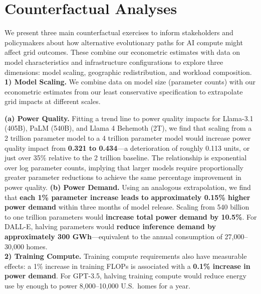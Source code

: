 \documentclass[sigconf,authordraft]{acmart}
\begin{document}

\section{Counterfactual Analyses}
\label{sec:counterfactuals}

We present three main counterfactual exercises to inform stakeholders and policymakers about how alternative evolutionary paths for AI compute might affect grid outcomes. These combine our econometric estimates with data on model characteristics and infrastructure configurations to explore three dimensions: model scaling, geographic redistribution, and workload composition.\\

\noindent\textbf{1) Model Scaling.} We combine data on model size (parameter counts) with our econometric estimates from our least conservative specification to extrapolate grid impacts at different scales.

\noindent\textbf{(a) Power Quality.} Fitting a trend line to power quality impacts for Llama-3.1 (405B), PaLM (540B), and Llama 4 Behemoth (2T), we find that scaling from a 2 trillion parameter model to a 4 trillion parameter model would increase power quality impact from \textbf{0.321 to 0.434}---a deterioration of roughly 0.113 units, or just over 35\% relative to the 2 trillion baseline. The relationship is exponential over log parameter counts, implying that larger models require proportionally greater parameter reductions to achieve the same percentage improvement in power quality. \textbf{(b) Power Demand.} Using an analogous extrapolation, we find that \textbf{each 1\% parameter increase leads to approximately 0.15\% higher power demand} within three months of model release. Scaling from 540 billion to one trillion parameters would \textbf{increase total power demand by 10.5\%}. For DALL-E, halving parameters would \textbf{reduce inference demand by approximately 300 GWh}---equivalent to the annual consumption of 27,000--30,000 homes.\\

\noindent\textbf{2) Training Compute.} Training compute requirements also have measurable effects: a 1\% increase in training FLOPs is associated with a \textbf{0.1\% increase in power demand}. For GPT-3.5, halving training compute would reduce energy use by enough to power 8,000--10,000 U.S.\ homes for a year.\\
\end{document}
